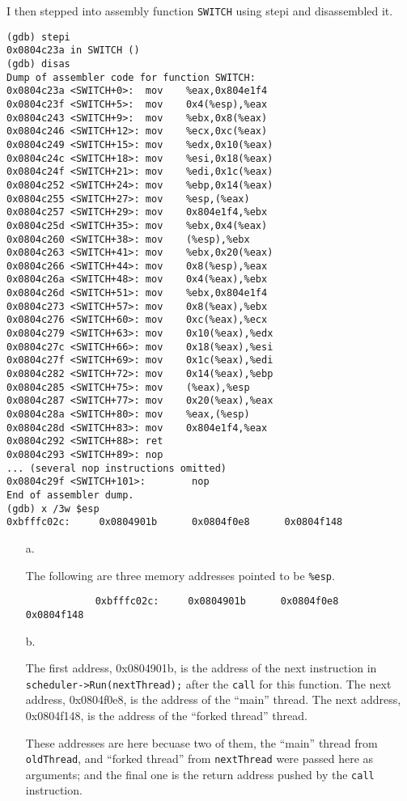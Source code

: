 \documentclass[letterpaper, 10pt]{article}
\begin{document}
	I then stepped into assembly function {\tt SWITCH} using stepi and disassembled it.

	\begin{verbatim}
(gdb) stepi
0x0804c23a in SWITCH ()
(gdb) disas
Dump of assembler code for function SWITCH:
0x0804c23a <SWITCH+0>:  mov    %eax,0x804e1f4
0x0804c23f <SWITCH+5>:  mov    0x4(%esp),%eax
0x0804c243 <SWITCH+9>:  mov    %ebx,0x8(%eax)
0x0804c246 <SWITCH+12>: mov    %ecx,0xc(%eax)
0x0804c249 <SWITCH+15>: mov    %edx,0x10(%eax)
0x0804c24c <SWITCH+18>: mov    %esi,0x18(%eax)
0x0804c24f <SWITCH+21>: mov    %edi,0x1c(%eax)
0x0804c252 <SWITCH+24>: mov    %ebp,0x14(%eax)
0x0804c255 <SWITCH+27>: mov    %esp,(%eax)
0x0804c257 <SWITCH+29>: mov    0x804e1f4,%ebx
0x0804c25d <SWITCH+35>: mov    %ebx,0x4(%eax)
0x0804c260 <SWITCH+38>: mov    (%esp),%ebx
0x0804c263 <SWITCH+41>: mov    %ebx,0x20(%eax)
0x0804c266 <SWITCH+44>: mov    0x8(%esp),%eax
0x0804c26a <SWITCH+48>: mov    0x4(%eax),%ebx
0x0804c26d <SWITCH+51>: mov    %ebx,0x804e1f4
0x0804c273 <SWITCH+57>: mov    0x8(%eax),%ebx
0x0804c276 <SWITCH+60>: mov    0xc(%eax),%ecx
0x0804c279 <SWITCH+63>: mov    0x10(%eax),%edx
0x0804c27c <SWITCH+66>: mov    0x18(%eax),%esi
0x0804c27f <SWITCH+69>: mov    0x1c(%eax),%edi
0x0804c282 <SWITCH+72>: mov    0x14(%eax),%ebp
0x0804c285 <SWITCH+75>: mov    (%eax),%esp
0x0804c287 <SWITCH+77>: mov    0x20(%eax),%eax
0x0804c28a <SWITCH+80>: mov    %eax,(%esp)
0x0804c28d <SWITCH+83>: mov    0x804e1f4,%eax
0x0804c292 <SWITCH+88>: ret
0x0804c293 <SWITCH+89>: nop
... (several nop instructions omitted)
0x0804c29f <SWITCH+101>:        nop
End of assembler dump.
(gdb) x /3w $esp
0xbfffc02c:     0x0804901b      0x0804f0e8      0x0804f148
	\end{verbatim}

	\begin{itemize}
		\item[a.]{
		The following are three memory addresses pointed to be {\tt \%esp}.
		\begin{verbatim}
			0xbfffc02c:     0x0804901b      0x0804f0e8      0x0804f148
		\end{verbatim}
		}
		\item[b.]{
		The first address, 0x0804901b, is the address of the next instruction in {\tt scheduler->Run(nextThread);} after the {\tt call} for this function. The next address, 0x0804f0e8, is the address of the ``main'' thread. The next address, 0x0804f148, is the address of the ``forked thread'' thread.

		These addresses are here becuase two of them, the ``main'' thread from {\tt oldThread}, and ``forked thread'' from {\tt nextThread} were passed here as arguments; and the final one is the return address pushed by the {\tt call} instruction.
		}
	\end{itemize}
\end{document}
